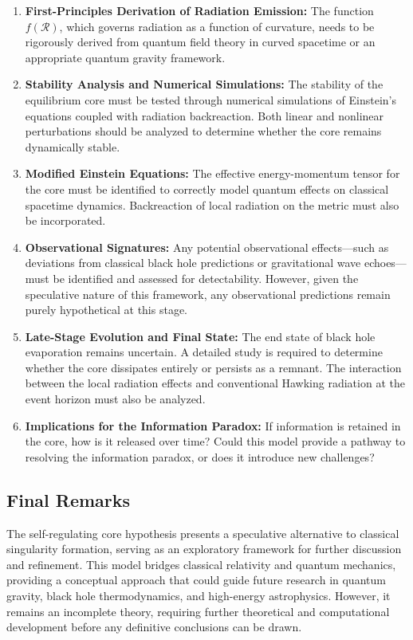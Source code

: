 \begin{enumerate}
    \item \textbf{First-Principles Derivation of Radiation Emission:} The function \( f(\mathcal{R}) \), which governs radiation as a function of curvature, needs to be rigorously derived from quantum field theory in curved spacetime or an appropriate quantum gravity framework.
    
    \item \textbf{Stability Analysis and Numerical Simulations:} The stability of the equilibrium core must be tested through numerical simulations of Einstein’s equations coupled with radiation backreaction. Both linear and nonlinear perturbations should be analyzed to determine whether the core remains dynamically stable.

    \item \textbf{Modified Einstein Equations:} The effective energy-momentum tensor for the core must be identified to correctly model quantum effects on classical spacetime dynamics. Backreaction of local radiation on the metric must also be incorporated.
    
    \item \textbf{Observational Signatures:} Any potential observational effects—such as deviations from classical black hole predictions or gravitational wave echoes—must be identified and assessed for detectability. However, given the speculative nature of this framework, any observational predictions remain purely hypothetical at this stage.
    
    \item \textbf{Late-Stage Evolution and Final State:} The end state of black hole evaporation remains uncertain. A detailed study is required to determine whether the core dissipates entirely or persists as a remnant. The interaction between the local radiation effects and conventional Hawking radiation at the event horizon must also be analyzed.
    
    \item \textbf{Implications for the Information Paradox:} If information is retained in the core, how is it released over time? Could this model provide a pathway to resolving the information paradox, or does it introduce new challenges?
\end{enumerate}

\subsection{Final Remarks}
The self-regulating core hypothesis presents a speculative alternative to classical singularity formation, serving as an exploratory framework for further discussion and refinement. This model bridges classical relativity and quantum mechanics, providing a conceptual approach that could guide future research in quantum gravity, black hole thermodynamics, and high-energy astrophysics. However, it remains an incomplete theory, requiring further theoretical and computational development before any definitive conclusions can be drawn.

